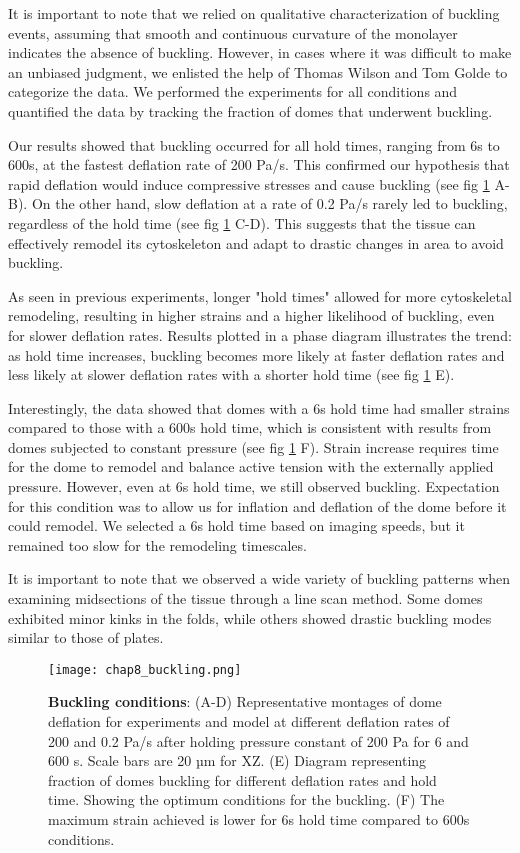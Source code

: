 It is important to note that we relied on qualitative characterization of buckling events, assuming that smooth and continuous curvature of the monolayer indicates the absence of buckling. However, in cases where it was difficult to make an unbiased judgment, we enlisted the help of Thomas Wilson and Tom Golde to categorize the data. We performed the experiments for all conditions and quantified the data by tracking the fraction of domes that underwent buckling.

Our results showed that buckling occurred for all hold times, ranging from 6s to 600s, at the fastest deflation rate of 200 Pa/s. This confirmed our hypothesis that rapid deflation would induce compressive stresses and cause buckling (see fig \ref{fig_8_3} A-B). On the other hand, slow deflation at a rate of 0.2 Pa/s rarely led to buckling, regardless of the hold time (see fig \ref{fig_8_3} C-D). This suggests that the tissue can effectively remodel its cytoskeleton and adapt to drastic changes in area to avoid buckling.

As seen in previous experiments, longer "hold times" allowed for more cytoskeletal remodeling, resulting in higher strains and a higher likelihood of buckling, even for slower deflation rates. Results plotted in a phase diagram illustrates the trend: as hold time increases, buckling becomes more likely at faster deflation rates and less likely at slower deflation rates with a shorter hold time (see fig \ref{fig_8_3} E).

Interestingly, the data showed that domes with a 6s hold time had smaller strains compared to those with a 600s hold time, which is consistent with results from domes subjected to constant pressure (see fig \ref{fig_8_3} F). Strain increase requires time for the dome to remodel and balance active tension with the externally applied pressure. However, even at 6s hold time, we still observed buckling. Expectation for this condition was to allow us for inflation and deflation of the dome before it could remodel. We selected a 6s hold time based on imaging speeds, but it remained too slow for the remodeling timescales.

It is important to note that we observed a wide variety of buckling patterns when examining midsections of the tissue through a line scan method. Some domes exhibited minor kinks in the folds, while others showed drastic buckling modes similar to those of plates.

\begin{figure}[h]
	\centering
	\texttt{[image: chap8\_buckling.png]}
	\caption{\label{fig_8_3} \textbf{Buckling conditions}: (A-D) Representative montages of dome deflation for experiments and model at different deflation rates of 200 and 0.2 Pa/s after holding pressure constant of 200 Pa for 6 and 600 s. Scale bars are 20 µm for XZ. (E) Diagram representing fraction of domes buckling for different deflation rates and hold time. Showing the optimum conditions for the buckling. (F) The maximum strain achieved is lower for 6s hold time compared to 600s conditions.
	}
\end{figure}


